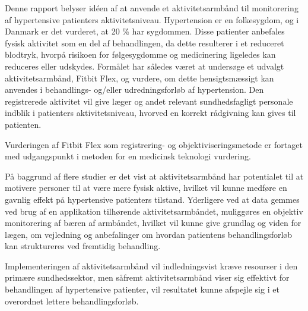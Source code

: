 Denne rapport belyser idéen af at anvende et aktivitetsarmbånd til monitorering af hypertensive patienters aktivitetsniveau. 
Hypertension er en folkesygdom, og i Danmark er det vurderet, at 20 \% har sygdommen. Disse patienter anbefales fysisk aktivitet som en del af behandlingen, da dette resulterer i et reduceret blodtryk, hvorpå risikoen for følgesygdomme og medicinering ligeledes kan reduceres eller udskydes. 
Formålet har således været at undersøge et udvalgt aktivitetsarmbånd, Fitbit Flex, og vurdere, om dette hensigtsmæssigt kan anvendes i behandlings- og/eller udredningsforløb af hypertension. 
Den registrerede aktivitet vil give læger og andet relevant sundhedsfagligt personale indblik i patienters aktivitetsniveau, hvorved en korrekt rådgivning kan gives til patienten. 

Vurderingen af Fitbit Flex som registrering- og objektiviseringsmetode er fortaget med udgangspunkt i metoden for en medicinsk teknologi vurdering.  

På baggrund af flere studier er det vist at aktivitetsarmbånd har potentialet til at motivere personer til at være mere fysisk aktive, hvilket vil kunne medføre en gavnlig effekt på hypertensive patienters tilstand. Yderligere ved at data gemmes ved brug af en applikation tilhørende aktivitetsarmbåndet, muliggøres en objektiv monitorering af bæren af armbåndet, hvilket vil kunne give grundlag og viden for lægen, om vejledning og anbefalinger om hvordan patientens behandlingsforløb kan struktureres ved fremtidig behandling.

Implementeringen af aktivitetsarmbånd vil indledningsvist kræve resourser i den primære sundhedssektor, men såfremt aktivitetsarmbånd viser sig effektivt for behandlingen af hypertensive patienter, vil resultatet kunne afspejle sig i et overordnet lettere behandlingsforløb.